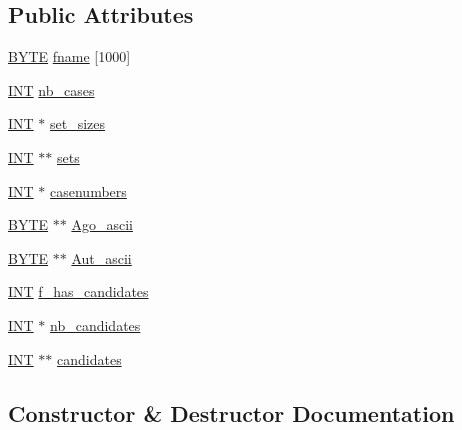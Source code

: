 \subsection*{Public Attributes}
\begin{DoxyCompactItemize}
\item 
\mbox{\hyperlink{galois_8h_ab6cc7b4aeb6ea31aba2b3fbfc83ff5e6}{B\+Y\+TE}} \mbox{\hyperlink{classdata__file_aa3ba8957bff97622ed7f9c5e6a93ebb1}{fname}} \mbox{[}1000\mbox{]}
\item 
\mbox{\hyperlink{galois_8h_a09fddde158a3a20bd2dcadb609de11dc}{I\+NT}} \mbox{\hyperlink{classdata__file_aefafdf8954d24ef053080bec5c7c99df}{nb\+\_\+cases}}
\item 
\mbox{\hyperlink{galois_8h_a09fddde158a3a20bd2dcadb609de11dc}{I\+NT}} $\ast$ \mbox{\hyperlink{classdata__file_a1f6f89f80e3843d91ca2b1ff1365f833}{set\+\_\+sizes}}
\item 
\mbox{\hyperlink{galois_8h_a09fddde158a3a20bd2dcadb609de11dc}{I\+NT}} $\ast$$\ast$ \mbox{\hyperlink{classdata__file_ae6bf0e3e6374ad81b962551112a51d04}{sets}}
\item 
\mbox{\hyperlink{galois_8h_a09fddde158a3a20bd2dcadb609de11dc}{I\+NT}} $\ast$ \mbox{\hyperlink{classdata__file_a8e501e588c47bcd003050dd60b2306f4}{casenumbers}}
\item 
\mbox{\hyperlink{galois_8h_ab6cc7b4aeb6ea31aba2b3fbfc83ff5e6}{B\+Y\+TE}} $\ast$$\ast$ \mbox{\hyperlink{classdata__file_a64d241eae5a2da949672c81e216e0a04}{Ago\+\_\+ascii}}
\item 
\mbox{\hyperlink{galois_8h_ab6cc7b4aeb6ea31aba2b3fbfc83ff5e6}{B\+Y\+TE}} $\ast$$\ast$ \mbox{\hyperlink{classdata__file_aed6eb5f22303e604c96a4fb172775be3}{Aut\+\_\+ascii}}
\item 
\mbox{\hyperlink{galois_8h_a09fddde158a3a20bd2dcadb609de11dc}{I\+NT}} \mbox{\hyperlink{classdata__file_acdc5c137f5c1b77a7351a5e4c71134fd}{f\+\_\+has\+\_\+candidates}}
\item 
\mbox{\hyperlink{galois_8h_a09fddde158a3a20bd2dcadb609de11dc}{I\+NT}} $\ast$ \mbox{\hyperlink{classdata__file_ad9b603cca311e09e081b174512d69cb3}{nb\+\_\+candidates}}
\item 
\mbox{\hyperlink{galois_8h_a09fddde158a3a20bd2dcadb609de11dc}{I\+NT}} $\ast$$\ast$ \mbox{\hyperlink{classdata__file_a859d18263e10670f79d9001968ffe1be}{candidates}}
\end{DoxyCompactItemize}


\subsection{Constructor \& Destructor Documentation}
\mbox{\label{classdata__file_a5104475f879c0e5fdcc35f906cf77db0}} 
